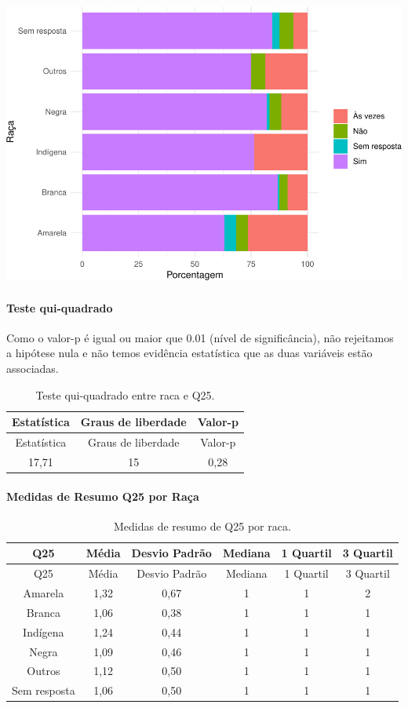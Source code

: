 \documentclass[]{article}
\let\oldparagraph\paragraph
\renewcommand{\paragraph}[1]{\oldparagraph{#1}\mbox{}}
\begin{document}
\begin{center}\includegraphics[width=0.75\linewidth]{relatorio_covid19_files/figure-latex/unnamed-chunk-693-1} \end{center}

\hypertarget{teste-qui-quadrado-60}{%
\paragraph{Teste qui-quadrado}\label{teste-qui-quadrado-60}}

Como o valor-p é igual ou maior que 0.01 (nível de significância), não rejeitamos a hipótese nula e não temos evidência estatística que as duas variáveis estão associadas.

\begin{longtable}[]{@{}ccc@{}}
\caption{\label{tab:unnamed-chunk-695}Teste qui-quadrado entre raca e Q25.}\tabularnewline
\toprule
Estatística & Graus de liberdade & Valor-p\tabularnewline
\midrule
\endfirsthead
\toprule
Estatística & Graus de liberdade & Valor-p\tabularnewline
\midrule
\endhead
17,71 & 15 & 0,28\tabularnewline
\bottomrule
\end{longtable}

\cleardoublepage

\hypertarget{medidas-de-resumo-q25-por-rauxe7a}{%
\paragraph{Medidas de Resumo Q25 por Raça}\label{medidas-de-resumo-q25-por-rauxe7a}}

\begin{longtable}[]{@{}cccccc@{}}
\caption{\label{tab:unnamed-chunk-696}Medidas de resumo de Q25 por raca.}\tabularnewline
\toprule
Q25 & Média & Desvio Padrão & Mediana & 1 Quartil & 3 Quartil\tabularnewline
\midrule
\endfirsthead
\toprule
Q25 & Média & Desvio Padrão & Mediana & 1 Quartil & 3 Quartil\tabularnewline
\midrule
\endhead
Amarela & 1,32 & 0,67 & 1 & 1 & 2\tabularnewline
Branca & 1,06 & 0,38 & 1 & 1 & 1\tabularnewline
Indígena & 1,24 & 0,44 & 1 & 1 & 1\tabularnewline
Negra & 1,09 & 0,46 & 1 & 1 & 1\tabularnewline
Outros & 1,12 & 0,50 & 1 & 1 & 1\tabularnewline
Sem resposta & 1,06 & 0,50 & 1 & 1 & 1\tabularnewline
\bottomrule
\end{longtable}
\end{document}
